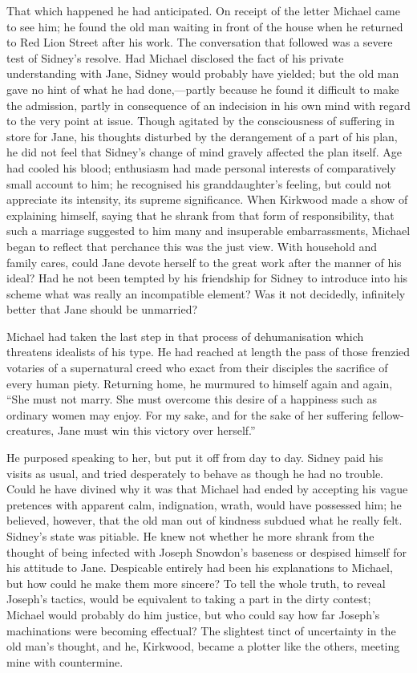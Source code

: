 That which happened he had anticipated. On receipt of the letter Michael
came to see him; he found the old man waiting in front of the house when
he returned to Red Lion Street after his work. The conversation that
followed {\protect\hypertarget{18}{}{}}was a severe test of Sidney's
resolve. Had Michael disclosed the fact of his private understanding
with Jane, Sidney would probably have yielded; but the old man gave no
hint of what he had done,---partly because he found it difficult to make
the admission, partly in consequence of an indecision in his own mind
with regard to the very point at issue. Though agitated by the
consciousness of suffering in store for Jane, his thoughts disturbed by
the derangement of a part of his plan, he did not feel that Sidney's
change of mind gravely affected the plan itself. Age had cooled his
blood; enthusiasm had made personal interests of comparatively small
account to him; he recognised his granddaughter's feeling, but could not
appreciate its intensity, its supreme significance. When Kirkwood made a
show of explaining himself, saying that he shrank from that form of
responsibility, that such a marriage suggested to him many and
insuperable embarrassments, Michael began to reflect that perchance this
was the just view. With household and family cares, could Jane devote
herself to the great work after the manner of his ideal? Had he not been
tempted by {\protect\hypertarget{19}{}{}}his friendship for Sidney to
introduce into his scheme what was really an incompatible element? Was
it not decidedly, infinitely better that Jane should be unmarried?

Michael had taken the last step in that process of dehumanisation which
threatens idealists of his type. He had reached at length the pass of
those frenzied votaries of a supernatural creed who exact from their
disciples the sacrifice of every human piety. Returning home, he
murmured to himself again and again, ``She must not marry. She must
overcome this desire of a happiness such as ordinary women may enjoy.
For my sake, and for the sake of her suffering fellow-creatures, Jane
must win this victory over herself.''

He purposed speaking to her, but put it off from day to day. Sidney paid
his visits as usual, and tried desperately to behave as though he had no
trouble. Could he have divined why it was that Michael had ended by
accepting his vague pretences with apparent calm, indignation, wrath,
would have possessed him; he believed, however, that the old man out of
kindness subdued what he really felt. Sidney's state was pitiable. He
knew not whether {\protect\hypertarget{20}{}{}}he more shrank from the
thought of being infected with Joseph Snowdon's baseness or despised
himself for his attitude to Jane. Despicable entirely had been his
explanations to Michael, but how could he make them more sincere? To
tell the whole truth, to reveal Joseph's tactics, would be equivalent to
taking a part in the dirty contest; Michael would probably do him
justice, but who could say how far Joseph's machinations were becoming
effectual? The slightest tinct of uncertainty in the old man's thought,
and he, Kirkwood, became a plotter like the others, meeting mine with
countermine.

